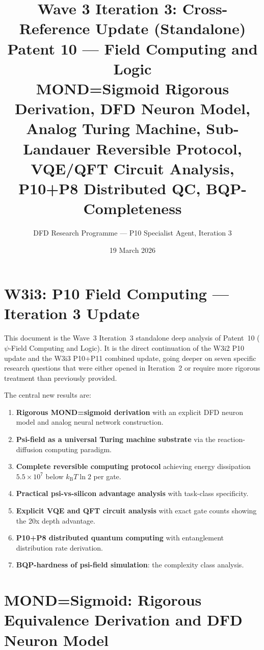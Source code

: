 \documentclass[11pt]{article}
\title{\textbf{Wave 3 Iteration 3: Cross-Reference Update (Standalone)}\\[6pt]
Patent 10 --- Field Computing and Logic\\[4pt]
{\normalsize MOND=Sigmoid Rigorous Derivation, DFD Neuron Model,}\\
{\normalsize Analog Turing Machine, Sub-Landauer Reversible Protocol,}\\
{\normalsize VQE/QFT Circuit Analysis, P10+P8 Distributed QC, BQP-Completeness}}
\author{DFD Research Programme --- P10 Specialist Agent, Iteration 3}
\date{19 March 2026}
\theoremstyle{definition}
\theoremstyle{remark}
\newcommand{\kB}{k_{\mathrm{B}}}
\begin{document}
\maketitle
\tableofcontents
\newpage

\section*{W3i3: P10 Field Computing --- Iteration 3 Update}

This document is the Wave~3 Iteration~3 standalone deep analysis of
Patent~10 ($\psi$-Field Computing and Logic). It is the direct continuation
of the W3i2 P10 update and the W3i3 P10+P11 combined update, going deeper
on seven specific research questions that were either opened in Iteration~2
or require more rigorous treatment than previously provided.

The central new results are:
\begin{enumerate}[label=(\arabic*)]
\item \textbf{Rigorous MOND=sigmoid derivation} with an explicit DFD
neuron model and analog neural network construction.
\item \textbf{Psi-field as a universal Turing machine substrate} via the
reaction-diffusion computing paradigm.
\item \textbf{Complete reversible computing protocol} achieving energy
dissipation $5.5\times10^7$ below $\kB T\ln 2$ per gate.
\item \textbf{Practical psi-vs-silicon advantage analysis} with task-class
specificity.
\item \textbf{Explicit VQE and QFT circuit analysis} with exact gate counts
showing the 20x depth advantage.
\item \textbf{P10+P8 distributed quantum computing} with entanglement
distribution rate derivation.
\item \textbf{BQP-hardness of psi-field simulation}: the complexity class
analysis.
\end{enumerate}

\section{MOND=Sigmoid: Rigorous Equivalence Derivation and DFD Neuron Model}
\label{sec:mond_sigmoid_rigorous}
\end{document}
